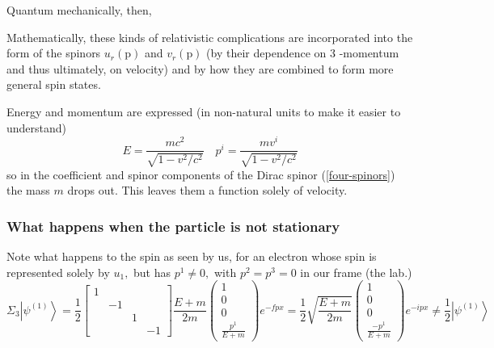 Quantum mechanically, then, 

Mathematically, these kinds of relativistic complications are incorporated into the form of the spinors $u_{r}(\mathrm{p})$ and $v_{r}(\mathrm{p})$ (by their dependence on 3 -momentum and thus ultimately, on velocity) and by how they are combined to form more general spin states.

\begin{qt}
 Energy and momentum are expressed (in non-natural units to make it easier to understand)
$$
E=\frac{m c^{2}}{\sqrt{1-v^{2} / c^{2}}} \quad p^{i}=\frac{m v^{i}}{\sqrt{1-v^{2} / c^{2}}}
$$
so in the coefficient and spinor components of the Dirac spinor (\ref{four-spinors}) the mass $m$ drops out. This leaves them a function solely of velocity.
\end{qt}

\subsubsection{What happens when the particle is not stationary}
Note what happens to the spin as seen by us, for an electron whose spin is represented solely by
$u_{1},$ but has $p^{1} \neq 0,$ with $p^{2}=p^{3}=0$ in our frame (the lab.)
$$
\Sigma_{3}\left|\psi^{(1)}\right\rangle=\frac{1}{2}\left[\begin{array}{cccc}
{1} & {} \\
{} & {-1} \\
{} & {} & {1} \\
{} & {} & {}&{-1}
\end{array}\right] \frac{E+m}{2 m}\left(\begin{array}{c}
{1} \\
{0} \\
{0} \\
{\frac{p^{1}}{E+m}}
\end{array}\right) e^{-f p x}=\frac{1}{2} \sqrt{\frac{E+m}{2 m}}\left(\begin{array}{c}
{1} \\
{0} \\
{0} \\
{\frac{-p^{1}}{E+m}}
\end{array}\right) e^{-i p x} \neq \frac{1}{2}\left|\psi^{(1)}\right\rangle
$$
\textbf{}

